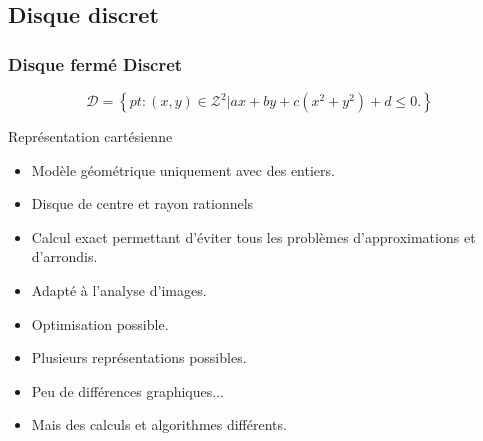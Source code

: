 \documentclass{beamer}
\begin{document}
\subsection{Disque discret}
\begin{frame}
  \frametitle{Disque fermé Discret}
  \begin{block}{}
    $$\mathcal{D} =  \left\{ pt : (x,y) \in \mathcal{Z}^{2} |  ax + by + c(x^2 + y^2) + d \leq 0. \right\}$$
  \end{block}

  \begin{block}{Représentation cartésienne}
    \begin{itemize}
      \item Modèle géométrique uniquement avec des entiers.
      \item Disque de centre et rayon rationnels
    \end{itemize}
  \end{block}
  \begin{exampleblock}{}
    \begin{itemize}
      \item Calcul exact permettant d'éviter tous les problèmes d'approximations et d'arrondis.
      \item Adapté à l'analyse d'images.
      \item Optimisation possible.
    \end{itemize}
  \end{exampleblock}

  \begin{exampleblock}{}
    \begin{itemize}
      \item Plusieurs représentations possibles.
      \item Peu de différences graphiques...
      \item Mais des calculs et algorithmes différents.
    \end{itemize}
  \end{exampleblock}

\end{frame}
\end{document}
